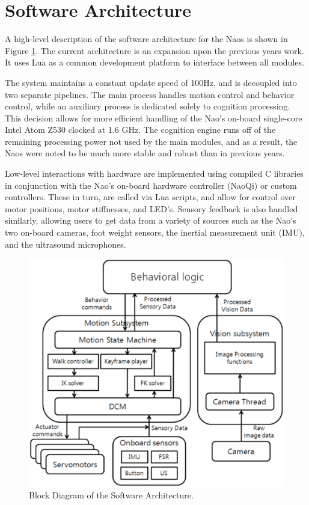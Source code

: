 \documentclass{article}
\begin{document}
\section{Software Architecture}
	A high-level description of the software architecture for the Naos is shown in Figure \ref{fig:softarch}. The current architecture is an expansion upon the previous years work. It uses Lua as a common development platform to interface between all modules.

	The system maintains a constant update speed of 100Hz, and is decoupled into two separate pipelines. The main process handles motion control and behavior control, while an auxiliary process is dedicated solely to cognition processing. This decision allows for more efficient handling of the Nao's on-board single-core Intel Atom Z530 clocked at 1.6 GHz. The cognition engine runs off of the remaining processing power not used by the main modules, and as a result, the Naos were noted to be much more stable and robust than in previous years.

	Low-level interactions with hardware are implemented using compiled C libraries in conjunction with the Nao's on-board hardware controller (NaoQi) or custom controllers. These in turn, are called via Lua scripts, and allow for control over motor positions, motor stiffnesses, and LED's. Sensory feedback is also handled similarly, allowing users to get data from a variety of sources such as the Nao's two on-board cameras, foot weight sensors, the inertial measurement unit (IMU), and the ultrasound microphones.


	\begin{figure}[H]
		\centering
		\includegraphics[width=1.0\textwidth]{figures/SoftArchOverview.eps}
		\caption{Block Diagram of the Software Architecture.}
		\label{fig:softarch}
	\end{figure}
\end{document}
